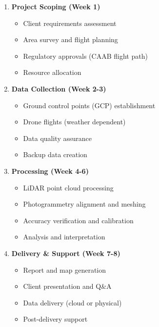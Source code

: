 \begin{enumerate}
    \item \textbf{Project Scoping (Week 1)}
        \begin{itemize}
            \item Client requirements assessment
            \item Area survey and flight planning
            \item Regulatory approvals (CAAB flight path)
            \item Resource allocation
        \end{itemize}

    \item \textbf{Data Collection (Week 2-3)}
        \begin{itemize}
            \item Ground control points (GCP) establishment
            \item Drone flights (weather dependent)
            \item Data quality assurance
            \item Backup data creation
        \end{itemize}

    \item \textbf{Processing (Week 4-6)}
        \begin{itemize}
            \item LiDAR point cloud processing
            \item Photogrammetry alignment and meshing
            \item Accuracy verification and calibration
            \item Analysis and interpretation
        \end{itemize}

    \item \textbf{Delivery \& Support (Week 7-8)}
        \begin{itemize}
            \item Report and map generation
            \item Client presentation and Q\&A
            \item Data delivery (cloud or physical)
            \item Post-delivery support
        \end{itemize}
\end{enumerate}

